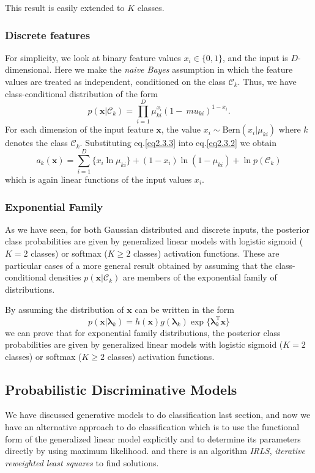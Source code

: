 \documentclass[a4paper]{book}
\newcommand{\mrm}{\mathrm}
\newcommand{\mbf}{\mathbf}
\newcommand{\mcal}{\mathcal}
\newcommand{\xx}{\mbf x}
\newcommand{\cat}{\mcal C}
\newcommand{\trans}{^{\mrm T}}
\begin{document}
This result is easily extended to $K$ classes.

\subsubsection*{Discrete features}
For simplicity, we look at binary feature values $x_i\in\{0,1\}$, and the input is $D$-dimensional. Here we make the \textit{naive Bayes} assumption in which the feature values are treated as independent, conditioned on the class $\cat_k$. Thus, we have class-conditional distribution of the form
\begin{equation}\label{eq2.3.3}
  p(\xx|\cat_k) = \prod_{i=1}^{D}\mu_{ki}^{x_i}(1-\ mu_{ki})^{1-x_i}.
\end{equation}
For each dimension of the input feature $\xx$, the value $x_i\sim \mrm{Bern}(x_i|\mu_{ki})$ where $k$ denotes the class $\cat_k$. Substituting eq.\ref{eq2.3.3} into eq.\ref{eq2.3.2} we obtain
\begin{equation}\label{}
  a_k(\xx) = \sum_{i=1}^{D}\{x_i\ln\mu_{ki}\}+(1-x_i)\ln(1-\mu_{ki})+\ln p(\cat_k)
\end{equation}
which is again linear functions of the input values $x_i$.

\subsubsection*{Exponential Family}
As we have seen, for both Gaussian distributed and discrete inputs, the posterior class probabilities are given by generalized linear models with logistic sigmoid ($K =
2$ classes) or softmax ($K \geq 2$ classes) activation functions. These are particular cases of a more general result obtained by assuming that the class-conditional densities $p(\xx|\cat_k)$ are members of the exponential family of distributions.

By assuming the distribution of $\xx$ can be written in the form
\begin{equation}\label{}
  p(\xx|\bm\lambda_k) = h(\xx)g(\bm\lambda_k)\exp\{\bm\lambda_k\trans\xx\}
\end{equation}
we can prove that for exponential family distributions, the posterior class probabilities are given by generalized linear models with logistic sigmoid ($K =
2$ classes) or softmax ($K \geq 2$ classes) activation functions.


\subsection{Probabilistic  Discriminative Models}
We have discussed generative models to do classification last section, and now we have an alternative approach to do classification which is to use the functional form of the generalized linear model explicitly and to determine its parameters directly by using maximum likelihood. and there is an algorithm \textit{IRLS}, \textit{iterative reweighted least squares} to find solutions.
\end{document}

